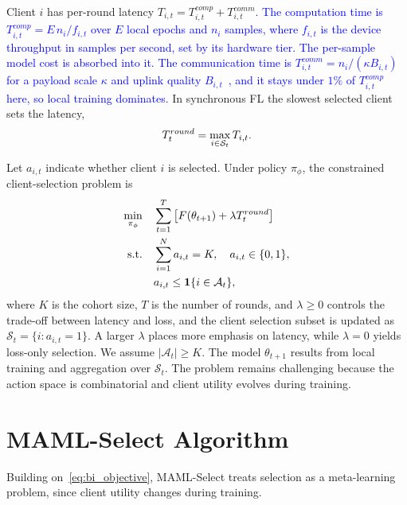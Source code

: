 \documentclass[journal]{IEEEtran}
\theoremstyle{remark}
\newcommand{\revision}[1]{#1}
\newcommand{\revtwo}[1]{\textcolor{blue}{#1}}
\begin{document}
\revision{Client $i$ has per-round latency $T_{i,t}=T_{i,t}^{comp}+T_{i,t}^{comm}$.} \revtwo{The computation time is $T_{i,t}^{comp}=E\,n_i/f_{i,t}$ over $E$ local epochs and $n_i$ samples, where $f_{i,t}$ is the device throughput in samples per second, set by its hardware tier. The per-sample model cost is absorbed into it. The communication time is $T_{i,t}^{comm}=n_i/(\kappa B_{i,t})$ for a payload scale $\kappa$ and uplink quality $B_{i,t}$}~\cite{nishio2019client}\revtwo{, and it stays under $1\%$ of $T_{i,t}^{comp}$ here, so local training dominates.} \revision{In synchronous FL the slowest selected client sets the latency,}
\begin{equation}
	\color{black}
	T_t^{round} = \max_{i \in \mathcal{S}_t} T_{i,t}.
	\label{eq:round_latency}
\end{equation}


\revision{Let $a_{i,t}$ indicate whether client $i$ is selected. Under policy $\pi_\phi$, the constrained client-selection problem is}
\begin{equation}
	\color{black}
	\begin{aligned}
		\min_{\pi_\phi}\quad & \sum_{t=1}^{T} \left[F(\theta_{t+1}) + \lambda T_t^{round}\right] \\
		\text{s.t.}\quad & \sum_{i=1}^{N} a_{i,t}=K,\quad a_{i,t}\in\{0,1\}, \\
		& a_{i,t}\leq \mathbf{1}\{i\in\mathcal{A}_t\},		
	\end{aligned}
	\label{eq:bi_objective}
\end{equation}
\revision{where $K$ is the cohort size, $T$ is the number of rounds, and $\lambda \geq 0$ controls the trade-off between latency and loss, and the client selection subset is updated as $\mathcal{S}_t=\{i:a_{i,t}=1\}$. A larger $\lambda$ places more emphasis on latency, while $\lambda=0$ yields loss-only selection. We assume $|\mathcal{A}_t|\geq K$. The model $\theta_{t+1}$ results from local training and aggregation over $\mathcal{S}_t$. The problem remains challenging because the action space is combinatorial and client utility evolves during training.}

\section{MAML-Select Algorithm}
\revision{Building on~\eqref{eq:bi_objective}, MAML-Select treats selection as a meta-learning problem, since client utility changes during training.}
\end{document}
